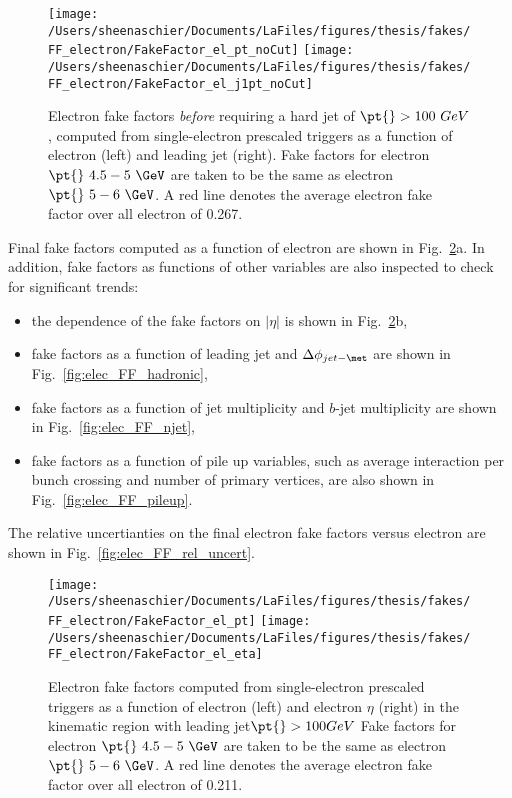 \begin{figure}[tbp]
  \centering
  \texttt{[image: /Users/sheenaschier/Documents/LaFiles/figures/thesis/fakes/FF\_electron/FakeFactor\_el\_pt\_noCut]}
  \texttt{[image: /Users/sheenaschier/Documents/LaFiles/figures/thesis/fakes/FF\_electron/FakeFactor\_el\_j1pt\_noCut]}\\
  \caption{Electron fake factors \textit{before} requiring a hard jet of $\pt{} > 100~GeV$, computed from single-electron prescaled triggers as a function of electron \pt{} (left) and leading jet \pt{} (right). Fake factors for electron $\pt{}~ 4.5-5~\GeV$ are taken to be the same as electron $\pt{}~5-6~\GeV$.  A red line denotes the average electron fake factor over all electron \pt{} of 0.267. }
  \label{fig:elec_FF_hist_noCut}
\end{figure}


Final fake factors computed as a function of electron \pt{} are shown in Fig.~\ref{fig:elec_FF_hist}a.  In addition, fake factors as functions of other variables are also inspected to check for significant trends:
\begin{itemize}
\item the dependence of the fake factors on $|\eta|$ is shown in Fig.~\ref{fig:elec_FF_hist}b,
\item fake factors as a function of leading jet \pt{} and  $\Delta\phi_{jet-\met}$ are shown in Fig.~\ref{fig:elec_FF_hadronic},
\item fake factors as a function of jet multiplicity and $b$-jet multiplicity are shown in Fig.~\ref{fig:elec_FF_njet},
\item fake factors as a function of pile up variables, such as average interaction per bunch crossing and number of primary vertices, are also shown in Fig.~\ref{fig:elec_FF_pileup}.
\end{itemize}
The relative uncertianties on the final electron fake factors versus electron \pt{} are shown in Fig.~\ref{fig:elec_FF_rel_uncert}.

\begin{figure}[tbp]
  \centering
  \texttt{[image: /Users/sheenaschier/Documents/LaFiles/figures/thesis/fakes/FF\_electron/FakeFactor\_el\_pt]}
  \texttt{[image: /Users/sheenaschier/Documents/LaFiles/figures/thesis/fakes/FF\_electron/FakeFactor\_el\_eta]}
  \caption{Electron fake factors computed from single-electron prescaled triggers as a function of electron \pt{} (left) and electron $\eta$ (right) in the kinematic region with leading jet$ \pt{}>100GeV$  Fake factors for electron $\pt{}~ 4.5-5~\GeV$ are taken to be the same as electron $\pt{}~5-6~\GeV$.  A red line denotes the average electron fake factor over all electron \pt{} of 0.211. }
  \label{fig:elec_FF_hist}
\end{figure}

